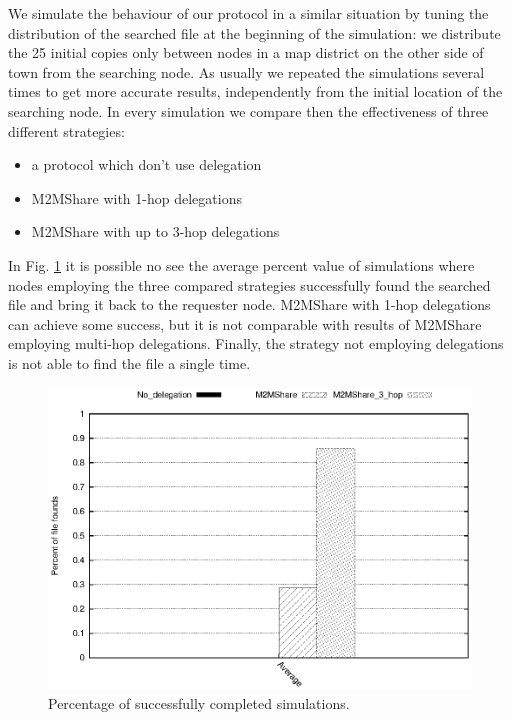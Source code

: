 We simulate the behaviour of our protocol in a similar situation by tuning the distribution of the searched file at the beginning of the simulation: we distribute the 25 initial copies only between nodes in a map district on the other side of town from the searching node. As usually we repeated the simulations several times to get more accurate results, independently from the initial location of the searching node. In every simulation we compare then the effectiveness of three different strategies:
\begin{itemize}
\item a protocol which don't use delegation
\item M2MShare with 1-hop delegations
\item M2MShare with up to 3-hop delegations
\end{itemize}

In Fig. \ref{graficoPercCompletedMultiHop} it is possible no see the average percent value of simulations where nodes employing the three compared strategies successfully found the searched file and bring it back to the requester node. M2MShare with 1-hop delegations can achieve some success, but it is not comparable with results of M2MShare employing multi-hop delegations. Finally, the strategy not employing delegations is not able to find the file a single time.

\begin{figure}[ht]
\begin{minipage}[b]{1\linewidth}
\centering
\includegraphics[scale=0.5]{grafici/percCompletaMultiHop.eps}
\caption{Percentage of successfully completed simulations.}
\label{graficoPercCompletedMultiHop}
\end{minipage}
\end{figure}

